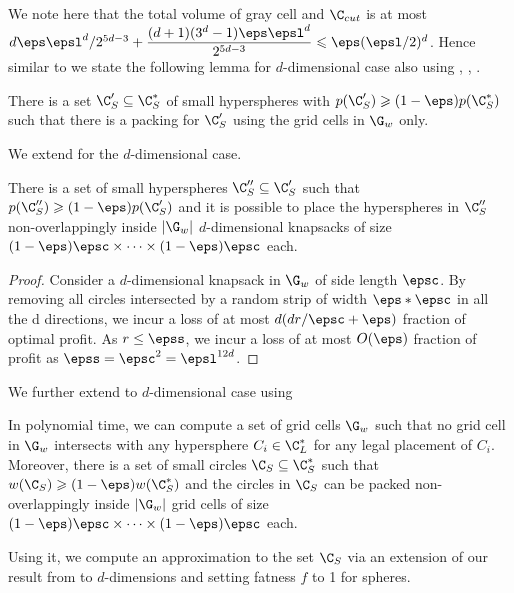 	We note here that the total volume of gray cell and \(\C_{cut}\) is at most \(d\eps\epsl^d/2^{5d-3}+\dfrac{(d+1)(3^d-1)\eps\epsl^d}{2^{5d-3}} \leqslant \eps (\epsl/2)^d\). Hence similar to  we state the following lemma for $d$-dimensional case also using , , .
	\begin{lem}
		\label{lem:small-circles-white-grid-cells-d}
		There
		is a set $\C'_S \subseteq \C^*_S$ of small hyperspheres with
		$p(\C'_S)\geqslant (1-\eps) p(\C^*_S)$
		such that there is a packing for $\C'_S$ using the grid cells in $\G_w$ only.
	\end{lem}
	We extend  for the $d$-dimensional case.
	\begin{lem} \label{lem:grid-resource-augmentation-d}
		There is a set of small hyperspheres $\C''_{S}\subseteq\C'_{S}$ such that $p(\C''_{S})\geqslant(1-\eps)p(\C'_{S})$
		and it is possible to place the hyperspheres in $\C''_{S}$ non-overlappingly
		inside $|\G_{w}|$ $d$-dimensional knapsacks of size $(1-\eps)\epsc \times\dots \times(1-\eps)\epsc$
		each. \end{lem}
	\begin{proof}
			Consider a $d$-dimensional knapsack in $\G_{w}$ of side length $\epsc$.
		By removing  all circles intersected by a random strip of width $\eps*\epsc$ in all the d directions, we incur a loss of at most $d(d r/\epsc + \eps)$ fraction of optimal profit. As $r\le \epss$, we incur a loss of at most $O(\eps)$ fraction of profit as $\epss = \epsc^2 = \epsl^{12d}$.
		
	\end{proof}
	We further extend  to $d$-dimensional case using 
	\begin{lemma}\label{lem:structured-packing-d}
		In polynomial time, we can compute a set of grid cells $\G_w$ such that no grid cell in $\G_w$ intersects with any
		hypersphere $C_i \in\C_{L}^{*}$ for any legal placement of $C_i$. Moreover, there is a set of small circles $\C_S \subseteq \C_{S}^{*}$ such that $w(\C_{S}) \geqslant (1-\eps)w(\C_{S}^{*})$ and
		the circles in $\C_S$ can be packed non-overlappingly inside $|\G_w|$ grid cells of size $(1-\eps) \epsc \times\dots\times(1-\eps) \epsc$ each.
	\end{lemma}
		Using it, we compute an approximation to the set $\C_S$ via an extension of our result from  to $d$-dimensions and setting fatness $f$ to 1 for spheres.
	
